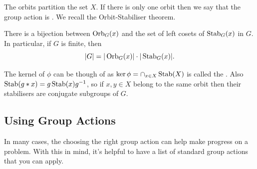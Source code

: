 \documentclass[a4paper]{scrartcl}
\begin{document}
The orbits partition the set $X$. If there is only one orbit then we say that the group action is .
We recall the Orbit-Stabiliser theorem.

\begin{theorem}
	There is a bijection between $\operatorname{Orb}_G(x)$ and the set of left cosets of $\operatorname{Stab}_G(x)$ in $G$. In particular, if $G$ is finite, then
	$$
	|G| = |\operatorname{Orb}_G(x)| \cdot |\operatorname{Stab}_G(x)|.
	$$
\end{theorem}

\begin{remark}
	The kernel of $\phi$ can be though of as $\operatorname{ker} \phi = \cap_{x \in X} \operatorname{Stab}(X)$ is called the .
	Also $\operatorname{Stab}(g * x) = g \operatorname{Stab}(x) g^{-1}$, so if $x, y \in X$ belong to the same orbit then their stabilisers are conjugate subgroups of $G$.
\end{remark}

\subsection{Using Group Actions}

In many cases, the choosing the right group action can help make progress on a problem. With this in mind, it's helpful to have a list of standard group actions that you can apply.
\end{document}
